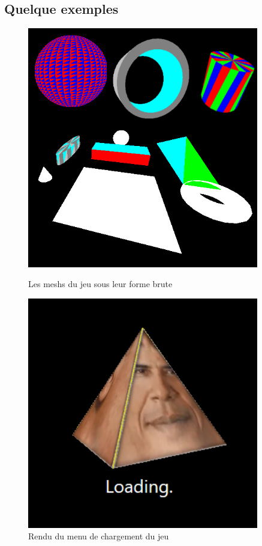 \subsection{Quelque exemples}
\begin{figure}[htbp]
    \centering
    \begin{minipage}{0.45\textwidth}
        \centering
        \includegraphics[width=0.9\textwidth]{images/GraphicAllMesh.png}
        \caption{Les meshs du jeu sous leur forme brute} 
    \end{minipage}%
    \hfill
    \begin{minipage}{0.45\textwidth}
        \centering
        \includegraphics[width=0.9\textwidth]{images/GraphicLoadingScreen.png}
        \caption{Rendu du menu de chargement du jeu}
    \end{minipage}
    

\end{figure}

